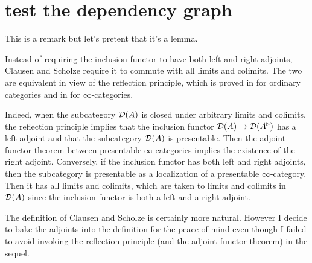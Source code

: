 \section{test the dependency graph}
This is a remark but let's pretent that it's a lemma.
\begin{lemma}
\label{affine::def::compare_with_videos}
Instead of requiring the inclusion functor to have both left and right adjoints,
Clausen and Scholze require it to commute with all limits and colimits.
The two are equivalent in view of the reflection principle,
which is proved in \cite{adamek_reflections_1989} for ordinary categories and in \cite{ragimov_infty-categorical_2022} for $ \infty $-categories.

Indeed, when the subcategory $ \mathcal{D} (A) $ is closed under arbitrary limits and colimits,
the reflection principle implies that the inclusion functor $ \mathcal{D} (A)\to \mathcal{D} (A ^{\triangleright}) $
has a left adjoint and that the subcategory
$ \mathcal{D} (A) $ is presentable.
Then the adjoint functor theorem between presentable $ \infty $-categories implies the existence of the right adjoint.
Conversely, if the inclusion functor has both left and right adjoints, then the subcategory is presentable as
a localization of a presentable $ \infty $-category. Then it has all limits and colimits,
which are taken to limits and colimits in $ \mathcal{D} (A) $ since the inclusion functor
is both a left and a right adjoint.

The definition of Clausen and Scholze is certainly more natural.
However I decide to bake the adjoints into the definition for the peace of mind
even though I failed to avoid invoking the reflection principle (and the adjoint functor theorem) in the sequel.
\end{lemma}

